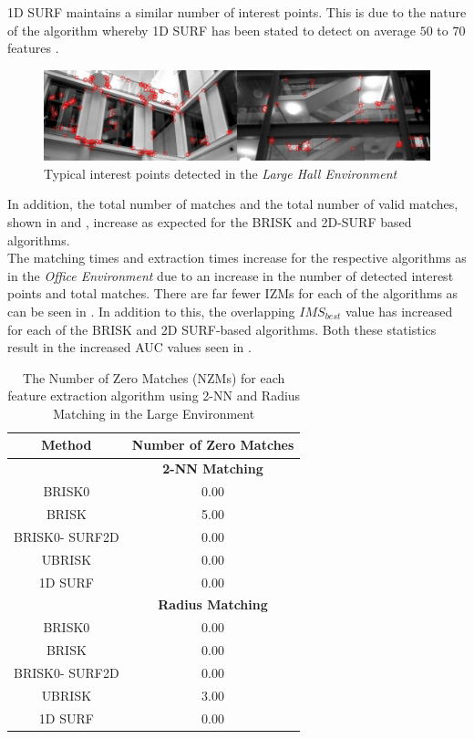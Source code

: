 \documentclass[11pt]{report}
\begin{document}
1D SURF maintains a similar number of interest points. This is due to the nature of the algorithm whereby 1D SURF has been stated to detect on average $50$ to $70$ features \citep{Anderson}.\\


\begin{figure}
  \centering
    \includegraphics[width=1.0\textwidth]{../Drawings/Matching/dataset3_interestPoints.jpg}
    \caption{Typical interest points detected in the \textit{Large Hall Environment}} 
    \label{fig:lh_ip}
\end{figure}


In addition, the total number of matches and the total number of valid matches, shown in  and , increase as expected for the BRISK and 2D-SURF based algorithms.\\

The matching times and extraction times increase for the respective algorithms as in the \textit{Office Environment} due to an increase in the number of detected interest points and total matches. There are far fewer IZMs for each of the algorithms as can be seen in . In addition to this, the overlapping $IMS_{best}$ value has increased for each of the BRISK and 2D SURF-based algorithms. Both these statistics result in the increased AUC values seen in . \\



\begin{table}
\centering
\caption{The Number of Zero Matches (NZMs) for each feature extraction algorithm
using 2-NN and Radius Matching in the Large Environment}
\begin{tabular}{|c|c|}
\hline 
\textbf{Method} & \textbf{Number of Zero Matches}\tabularnewline
\hline 
 & \textbf{2-NN Matching}\tabularnewline
\hline 
\hline 
BRISK0 & 0.00\tabularnewline
\hline 
BRISK & 5.00\tabularnewline
\hline 
BRISK0- SURF2D & 0.00\tabularnewline
\hline 
UBRISK & 0.00\tabularnewline
\hline 
1D SURF & 0.00\tabularnewline
\hline 
 & \textbf{Radius Matching}\tabularnewline
\hline 
BRISK0 & 0.00\tabularnewline
\hline 
BRISK & 0.00\tabularnewline
\hline 
BRISK0- SURF2D & 0.00\tabularnewline
\hline 
UBRISK & 3.00\tabularnewline
\hline 
1D SURF & 0.00\tabularnewline
\hline 
\end{tabular}
\label{tab:lh_izm}
\end{table}
\end{document}
